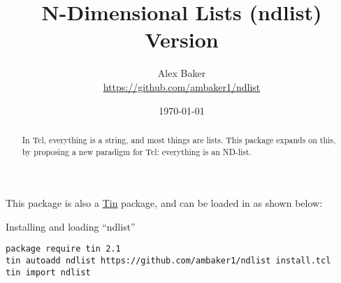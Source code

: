 \documentclass{article}
\title{\Huge{N-Dimensional Lists (ndlist)}\\\large Version \version}
\author{Alex Baker\\\small\url{https://github.com/ambaker1/ndlist}}
\date{\small\today}
\begin{document}
\maketitle
\begin{abstract}
In Tcl, everything is a string, and most things are lists. This package expands on this, by proposing a new paradigm for Tcl: everything is an ND-list. 
\end{abstract}
\vspace{20 pt}

This package is also a \textcolor{blue}{\href{https://github.com/ambaker1/Tin}{Tin}} package, and can be loaded in as shown below:
\begin{example}{Installing and loading ``ndlist''}
\begin{lstlisting}
package require tin 2.1
tin autoadd ndlist https://github.com/ambaker1/ndlist install.tcl
tin import ndlist
\end{lstlisting}
\end{example}

\clearpage





\printindex
\end{document}
